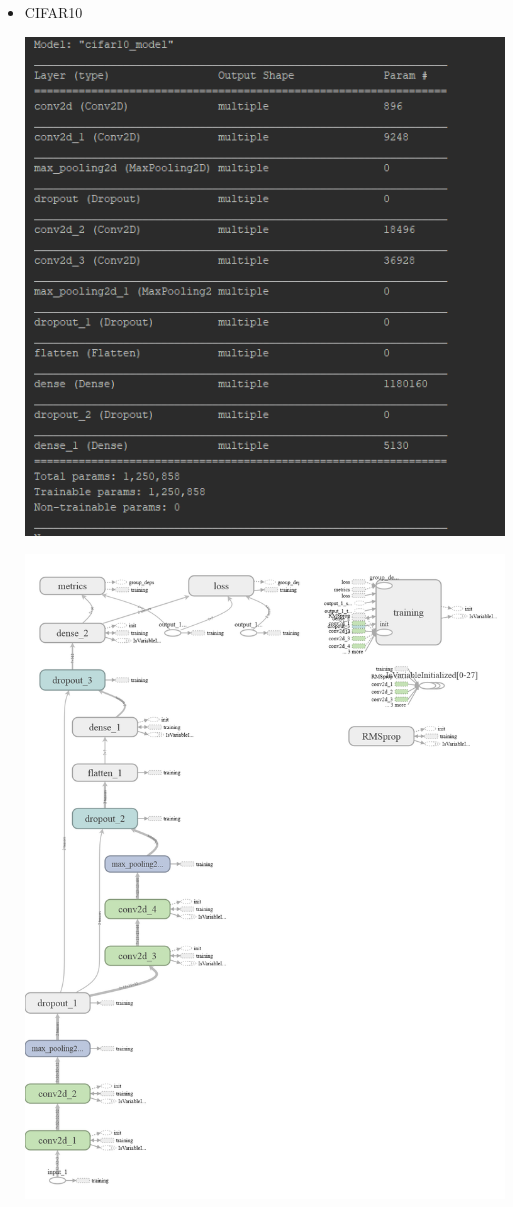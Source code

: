 \documentclass[a4paper,11pt]{article}
\begin{document}
\begin{itemize}
	\newpage
	\item CIFAR10\par
	\begin{minipage}{\linewidth}
		\centering
		\includegraphics[width=1\linewidth]{modelCifar10}
	\end{minipage}
	\begin{minipage}{\linewidth}
		\centering
		\includegraphics[width=1\linewidth]{cifar10-graph}

\end{minipage}
\end{itemize}
\end{document}
